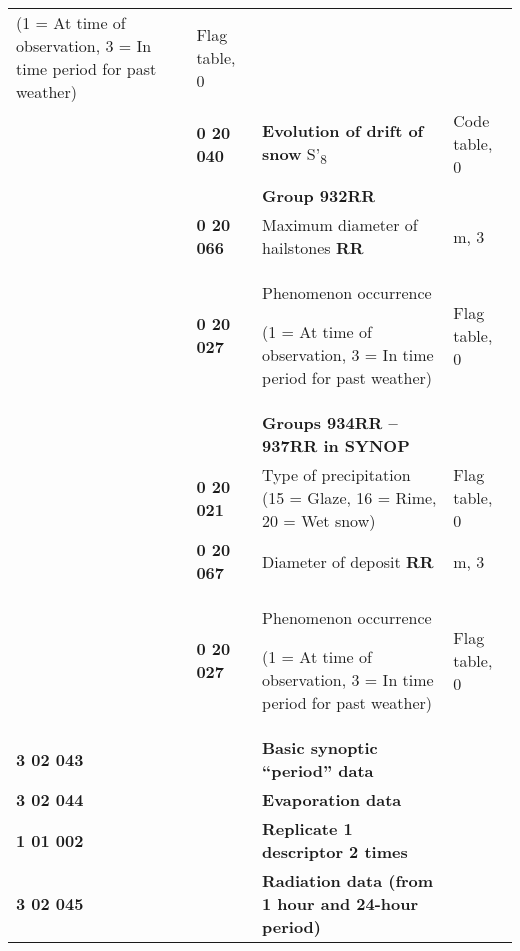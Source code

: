 \begin{longtable}[]{@{}llll@{}}
\begin{minipage}[t]{0.22\columnwidth}
(1 = At time of observation, 3 = In time period for past weather)\strut
\end{minipage} & \begin{minipage}[t]{0.22\columnwidth}\raggedright
Flag table, 0\strut
\end{minipage}\tabularnewline
& \textbf{0 20 040} & \textbf{Evolution of drift of snow} S'\textsubscript{8} & Code table, 0\tabularnewline
& & \textbf{Group 932RR} &\tabularnewline
& \textbf{0 20 066} & Maximum diameter of hailstones \textbf{RR} & m, 3\tabularnewline
\begin{minipage}[t]{0.22\columnwidth}\raggedright
\strut
\end{minipage} & \begin{minipage}[t]{0.22\columnwidth}\raggedright
\textbf{0 20 027}\strut
\end{minipage} & \begin{minipage}[t]{0.22\columnwidth}\raggedright
Phenomenon occurrence

(1 = At time of observation, 3 = In time period for past weather)\strut
\end{minipage} & \begin{minipage}[t]{0.22\columnwidth}\raggedright
Flag table, 0\strut
\end{minipage}\tabularnewline
& & \textbf{Groups 934RR -- 937RR in SYNOP} &\tabularnewline
& \textbf{0 20 021} & Type of precipitation (15 = Glaze, 16 = Rime, 20 = Wet snow) & Flag table, 0\tabularnewline
& \textbf{0 20 067} & Diameter of deposit \textbf{RR} & m, 3\tabularnewline
\begin{minipage}[t]{0.22\columnwidth}\raggedright
\strut
\end{minipage} & \begin{minipage}[t]{0.22\columnwidth}\raggedright
\textbf{0 20 027}\strut
\end{minipage} & \begin{minipage}[t]{0.22\columnwidth}\raggedright
Phenomenon occurrence

(1 = At time of observation, 3 = In time period for past weather)\strut
\end{minipage} & \begin{minipage}[t]{0.22\columnwidth}\raggedright
Flag table, 0\strut
\end{minipage}\tabularnewline
\textbf{3 02 043} & & \textbf{Basic synoptic ``period'' data} &\tabularnewline
\textbf{3 02 044} & & \textbf{Evaporation data} &\tabularnewline
\textbf{1 01 002} & & \textbf{Replicate 1 descriptor 2 times} &\tabularnewline
\textbf{3 02 045} & & \textbf{Radiation data (from 1 hour and 24-hour period)} &\tabularnewline
\bottomrule
\end{longtable}

